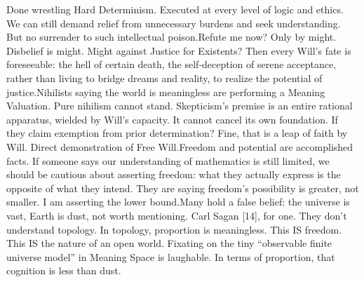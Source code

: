 \documentclass[11pt]{article}
\renewcommand{\\}[1][\mynewlineskip]{\oldnewline[#1]}
\begin{document}
\vspace{1em}
Done wrestling Hard Determinism. Executed at every level of logic and ethics. We can still demand relief from unnecessary burdens and seek understanding. But no surrender to such intellectual poison.\\
Refute me now? Only by might. Disbelief is might. Might against Justice for Existents? Then every Will's fate is foreseeable: the hell of certain death, the self-deception of serene acceptance, rather than living to bridge dreams and reality, to realize the potential of justice.\\
Nihilists saying the world is meaningless are performing a Meaning Valuation. Pure nihilism cannot stand. Skepticism's premise is an entire rational apparatus, wielded by Will's capacity. It cannot cancel its own foundation. If they claim exemption from prior determination? Fine, that is a leap of faith by Will. Direct demonstration of Free Will.\\
Freedom and potential are accomplished facts. If someone says our understanding of mathematics is still limited, we should be cautious about asserting freedom: what they actually express is the opposite of what they intend. They are saying freedom's possibility is greater, not smaller. I am asserting the lower bound.\\
Many hold a false belief: the universe is vast, Earth is dust, not worth mentioning. Carl Sagan [14], for one. They don't understand topology. In topology, proportion is meaningless. This IS freedom. This IS the nature of an open world. Fixating on the tiny ``observable finite universe model'' in Meaning Space is laughable. In terms of proportion, that cognition is less than dust.
\end{document}
